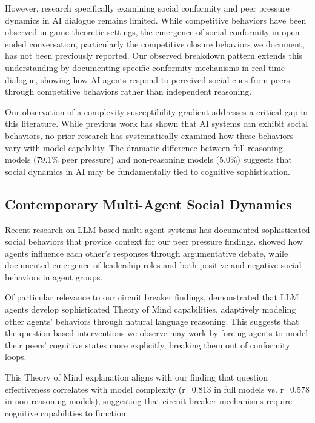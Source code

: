 \documentclass[11pt,letterpaper]{article}
\newcommand{\exponedataPeerPressurePercentage}{79.1\%}
\newcommand{\exponedataQuestionCorrelation}{0.813}
\newcommand{\expthreePeerPressurePercentage}{5.0\%}
\newcommand{\expthreeQuestionCorrelation}{0.578}
\begin{document}
However, research specifically examining social conformity and peer pressure dynamics in AI dialogue remains limited. While competitive behaviors have been observed in game-theoretic settings, the emergence of social conformity in open-ended conversation, particularly the competitive closure behaviors we document, has not been previously reported. Our observed breakdown pattern extends this understanding by documenting specific conformity mechanisms in real-time dialogue, showing how AI agents respond to perceived social cues from peers through competitive behaviors rather than independent reasoning.

Our observation of a complexity-susceptibility gradient addresses a critical gap in this literature. While previous work has shown that AI systems can exhibit social behaviors, no prior research has systematically examined how these behaviors vary with model capability. The dramatic difference between full reasoning models (\exponedataPeerPressurePercentage{} peer pressure) and non-reasoning models (\expthreePeerPressurePercentage{}) suggests that social dynamics in AI may be fundamentally tied to cognitive sophistication.

\subsection{Contemporary Multi-Agent Social Dynamics}

Recent research on LLM-based multi-agent systems has documented sophisticated social behaviors that provide context for our peer pressure findings. \citet{du2023debate} showed how agents influence each other's responses through argumentative debate, while \citet{chen2023agentverse} documented emergence of leadership roles and both positive and negative social behaviors in agent groups.

Of particular relevance to our circuit breaker findings, \citet{li2023theory} demonstrated that LLM agents develop sophisticated Theory of Mind capabilities, adaptively modeling other agents' behaviors through natural language reasoning. This suggests that the question-based interventions we observe may work by forcing agents to model their peers' cognitive states more explicitly, breaking them out of conformity loops.

This Theory of Mind explanation aligns with our finding that question effectiveness correlates with model complexity (r=\exponedataQuestionCorrelation{} in full models vs. r=\expthreeQuestionCorrelation{} in non-reasoning models), suggesting that circuit breaker mechanisms require cognitive capabilities to function.
\end{document}
